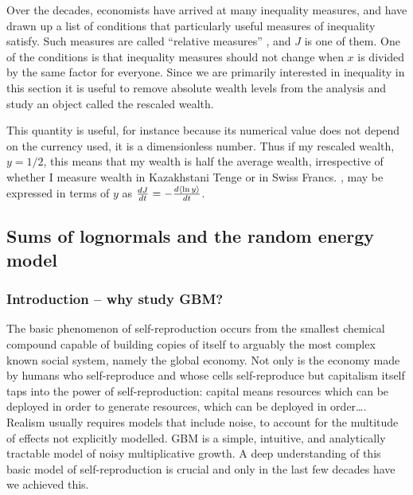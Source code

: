 Over the decades, economists have arrived at many inequality measures, and have drawn 
up a list of conditions that particularly useful measures of inequality satisfy. Such measures
are called ``relative measures'' \cite[Appendix 4]{Sen1997}, and $J$ is one of them. One of the conditions is that inequality measures
should not change when $x$ is divided by the same factor for everyone. Since we are primarily 
interested in inequality in this section it is useful to remove absolute wealth levels from the
analysis and study an object called the rescaled wealth.


This quantity is useful, for instance because its numerical value does not 
depend on the currency used, it is a dimensionless number. 
Thus if my rescaled wealth, $y=1/2$, this means that my wealth is half the 
average wealth, irrespective of whether I measure wealth in Kazakhstani Tenge 
or in Swiss Francs. , may be expressed in 
terms of $y$ as $\frac{dJ}{dt}=-\frac{d\left\langle\ln y \right\rangle}{dt}$. 


\subsection{Sums of lognormals and the random energy model}

\subsubsection{Introduction -- why study GBM?}
The basic phenomenon of self-reproduction occurs from the 
smallest chemical compound capable of building copies of itself to arguably the most complex 
known social system, namely the global economy. Not only is the economy made by humans 
who self-reproduce and whose cells self-reproduce but capitalism itself taps into the power of 
self-reproduction: capital means resources which can be deployed in order to 
generate resources, which can be deployed in order\dots. Realism usually requires models that include noise, to account for the multitude of effects not explicitly modelled. GBM is a simple, intuitive, and analytically tractable model of noisy multiplicative growth. 
A deep understanding of this basic model of self-reproduction is crucial and only in the last few decades have 
we achieved this. 

